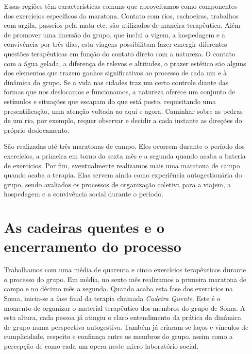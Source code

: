 Essas regiões têm características comuns que aproveitamos como
componentes dos exercícios específicos da maratona. Contato com rios,
cachoeiras, trabalhos com argila, passeios pela mata etc. são utilizados
de maneira terapêutica. Além de promover uma imersão do grupo, que
inclui a vigem, a hospedagem e a convivência por três dias, esta viagens
possibilitam fazer emergir diferentes questões terapêuticas em função do
contato direto com a natureza. O contato com a água gelada, a diferença
de relevos e altitudes, o prazer estético são alguns dos elementos que
trazem ganhos significativos ao processo de cada um e à dinâmica do
grupo. Se a vida nas cidades traz um certo controle diante das formas
que nos deslocamos e funcionamos, a natureza oferece um conjunto de
estímulos e situações que escapam do que está posto, requisitando uma
presentificação, uma atenção voltada ao aqui e agora. Caminhar sobre as
pedras de um rio, por exemplo, requer observar e decidir a cada instante
as direções do próprio deslocamento.

São realizadas até três maratonas de campo. Eles ocorrem durante o
período dos exercícios, a primeira em torno do sexta mês e a segunda
quando acaba a bateria de exercícios. Por fim, eventualmente realizamos
mais uma maratona de campo quando acaba a terapia. Elas servem ainda
como experiência autogestionária do grupo, sendo avaliados os processos
de organização coletiva para a viajem, a hospedagem e a convivência
social durante o período.

\section{As cadeiras quentes e o encerramento do processo}

Trabalhamos com uma média de quarenta e cinco exercícios terapêuticos
durante o processo do grupo. Em média, no sexto mês realizamos a
primeira maratona de campo e no décimo mês a segunda. Quando acaba esta
fase dos exercícios na Soma, inicia-se a fase final da terapia chamada
\emph{Cadeira Quente}. Este é o momento de organizar o material
terapêutico dos membros do grupo de Soma. A esta altura, cada pessoa já
atingiu o claro entendimento da prática da dinâmica de grupo numa
perspectiva autogestiva. Também já criaram-se laços e vínculos de
cumplicidade, respeito e confiança entre os membros do grupo, assim como
a percepção de como cada um opera neste micro laboratório social.

